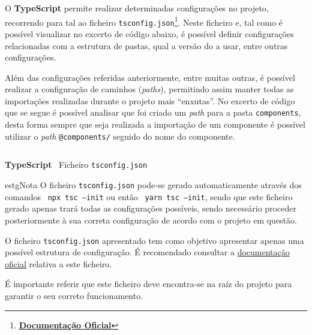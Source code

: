 
O \textbf{TypeScript} permite realizar determinadas configurações no projeto, recorrendo para tal ao ficheiro \texttt{tsconfig.json}\footnote{\textbf{\href{https://www.typescriptlang.org/tsconfig}{Documentação Oficial}}}. Neste ficheiro e, tal como é possível visualizar no excerto de código abaixo, é possível definir configurações relacionadas com a estrutura de pastas, qual a versão do  a usar, entre outras configurações.

Além das configurações referidas anteriormente, entre muitas outras, é possível realizar a configuração de caminhos (\textit{paths}), permitindo assim manter todas as importações realizadas durante o projeto mais ``enxutas''. No excerto de código que se segue é possível analisar que foi criado um \textit{path} para a pasta \texttt{components}, desta forma sempre que seja realizada a importação de um componente é possível utilizar o \textit{path} \texttt{@components/} seguido do nome do componente.

\begin{longlisting}
	\inputminted{json}{code/typescript/tsconfig.json}
	\caption{\textbf{TypeScript} \textemdash~Ficheiro \texttt{tsconfig.json}}
\end{longlisting}

\begin{mybox}{estg}{Nota}
	O ficheiro \texttt{tsconfig.json} pode-se gerado automaticamente através dos comandos ~\texttt{npx tsc --init} ou então ~\texttt{yarn tsc --init}, sendo que este ficheiro gerado apenas trará todas as configurações possíveis, sendo necessário proceder posteriormente à sua correta configuração de acordo com o projeto em questão.

	\vspace{0.35cm}

	O ficheiro \texttt{tsconfig.json} apresentado tem como objetivo apresentar apenas uma possível estrutura de configuração. É recomendado consultar a \href{https://www.typescriptlang.org/tsconfig}{documentação oficial} relativa a este ficheiro.

	\vspace{0.15cm}

	É importante referir que este ficheiro deve encontra-se na raíz do projeto para garantir o seu correto funcionamento.
\end{mybox}